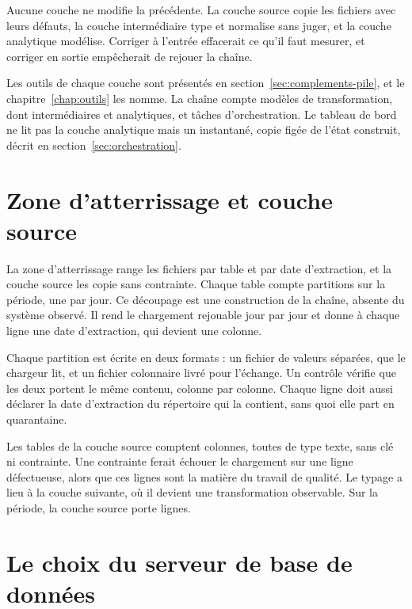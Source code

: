 Aucune couche ne modifie la précédente. La couche source copie les fichiers avec leurs défauts, la
couche intermédiaire type et normalise sans juger, et la couche analytique modélise. Corriger à
l'entrée effacerait ce qu'il faut mesurer, et corriger en sortie empêcherait de rejouer la chaîne.

Les outils de chaque couche sont présentés en section~\ref{sec:complements-pile}, et le
chapitre~\ref{chap:outils} les nomme. La chaîne compte  modèles de transformation, dont
 intermédiaires et  analytiques, et
 tâches d'orchestration. Le tableau de bord ne lit pas la couche analytique
mais un instantané, copie figée de l'état construit, décrit en section~\ref{sec:orchestration}.

\section{Zone d'atterrissage et couche source}

La zone d'atterrissage range les fichiers par table et par date d'extraction, et la couche source
les copie sans contrainte. Chaque table compte  partitions sur la
période, une par jour. Ce découpage est une construction de la chaîne, absente du système observé.
Il rend le chargement rejouable jour par jour et donne à chaque ligne une date d'extraction, qui
devient une colonne.

Chaque partition est écrite en deux formats : un fichier de valeurs séparées, que le chargeur lit,
et un fichier colonnaire livré pour l'échange. Un contrôle vérifie que les deux portent le même
contenu, colonne par colonne. Chaque ligne doit aussi déclarer la date d'extraction du
répertoire qui la contient, sans quoi elle part en quarantaine.

Les  tables de la couche source comptent 
colonnes, toutes de type texte, sans clé ni contrainte. Une contrainte ferait échouer le chargement
sur une ligne défectueuse, alors que ces lignes sont la matière du travail de qualité. Le typage a
lieu à la couche suivante, où il devient une transformation observable. Sur la période, la couche
source porte  lignes.

\section{Le choix du serveur de base de données}\label{sec:choix-serveur}

